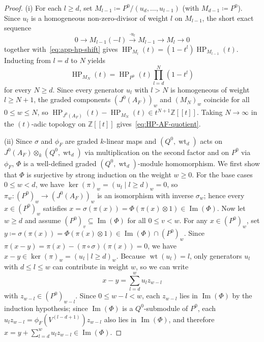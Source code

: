 \documentclass[a4paper, 12pt, reqno]{amsart}
\theoremstyle{remark}
\begin{document}
\begin{proof}
  (i) For each $l \ge d$,
  set $M_{l - 1} \coloneq P^0 / (u_d, \dots, u_{l - 1})$ (with $M_{d - 1} \coloneq P^0$).
  Since $u_l$ is a homogeneous non-zero-divisor of weight $l$ on $M_{l - 1}$,
  the short exact sequence
  \begin{equation*}
    0 \longrightarrow M_{l - 1}(-l) \xrightarrow{\cdot u_l} M_{l - 1} \longrightarrow M_l \longrightarrow 0
  \end{equation*}
  together with~\eqref{eq:app-hp-shift} gives $\operatorname{HP}_{M_l}(t) = (1 - t^l) \operatorname{HP}_{M_{l - 1}}(t)$.
  Inducting from $l = d$ to $N$ yields
  \begin{equation*}
    \operatorname{HP}_{M_N}(t) = \operatorname{HP}_{P^0}(t) \prod_{l = d}^N (1 - t^l)
  \end{equation*}
  for every $N \ge d$.
  Since every generator $u_l$ with $l > N$ is homogeneous of weight $l \ge N + 1$,
  the graded components $(J^0(A_F))_w$ and $(M_N)_w$ coincide for all $0 \le w \le N$,
  so $\operatorname{HP}_{J^0(A_F)}(t) - \operatorname{HP}_{M_N}(t) \in t^{N + 1}\mathbb{Z}[[t]]$.
  Taking $N \to \infty$ in the $(t)$-adic topology on $\mathbb{Z}[[t]]$ gives~\eqref{eq:HP-AF-quotient}.

  (ii) Since $\sigma$ and $\phi_F$ are graded $k$-linear maps and $(Q^0, \operatorname{wt}_d)$ acts on $J^0(A_F) \otimes_k (Q^0, \operatorname{wt}_d)$ via multiplication on the second factor and on $P^0$ via $\phi_F$,
  $\Phi$ is a well-defined graded $(Q^0, \operatorname{wt}_d)$-module homomorphism.
  We first show that $\Phi$ is surjective by strong induction on the weight $w \ge 0$.
  For the base cases $0 \le w < d$,
  we have $\ker(\pi)_w = (u_l \mid l \ge d)_w = 0$,
  so $\pi_w \colon (P^0)_w \to (J^0(A_F))_w$ is an isomorphism with inverse $\sigma_w$;
  hence every $x \in (P^0)_w$ satisfies $x = \sigma(\pi(x)) = \Phi(\pi(x) \otimes 1) \in \operatorname{Im}(\Phi)$.
  Now let $w \ge d$ and assume $(P^0)_v \subseteq \operatorname{Im}(\Phi)$ for all $0 \le v < w$.
  For any $x \in (P^0)_w$,
  set $y \coloneq \sigma(\pi(x)) = \Phi(\pi(x) \otimes 1) \in \operatorname{Im}(\Phi) \cap (P^0)_w$.
  Since $\pi(x - y) = \pi(x) - (\pi \circ \sigma)(\pi(x)) = 0$,
  we have $x - y \in \ker(\pi)_w = (u_l \mid l \ge d)_w$.
  Because $\operatorname{wt}(u_l) = l$,
  only generators $u_l$ with $d \le l \le w$ can contribute in weight $w$,
  so we can write
  \begin{equation*}
    x - y = \sum_{l = d}^w u_l z_{w - l}
  \end{equation*}
  with $z_{w - l} \in (P^0)_{w - l}$.
  Since $0 \le w - l < w$,
  each $z_{w - l}$ lies in $\operatorname{Im}(\Phi)$ by the induction hypothesis;
  since $\operatorname{Im}(\Phi)$ is a $Q^0$-submodule of $P^0$,
  each $u_l z_{w - l} = \phi_F(V^{(l - d + 1)}) z_{w - l}$ also lies in $\operatorname{Im}(\Phi)$,
  and therefore $x = y + \sum_{l = d}^w u_l z_{w - l} \in \operatorname{Im}(\Phi)$.


\end{proof}
\end{document}
